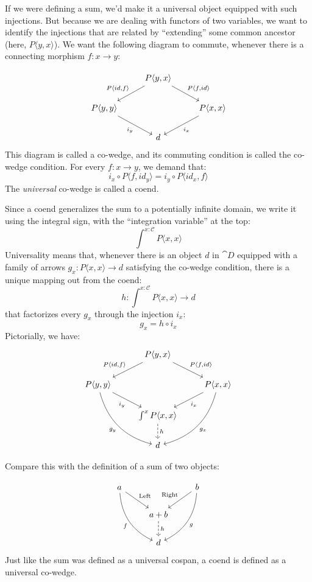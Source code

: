 \documentclass[DaoFP]{subfiles}
\begin{document}
If we were defining a sum, we'd make it a universal object equipped with such injections. But because we are dealing with functors of two variables, we want to identify the injections that are related by ``extending'' some common ancestor (here, $P \langle y, x \rangle$). We want the following diagram to commute, whenever there is a connecting morphism $f\colon x \to y$:

\[
 \begin{tikzcd}
 &P \langle y, x \rangle
 \arrow[ld, "{P \langle id, f \rangle}"']
 \arrow[rd, "{P \langle f, id \rangle}"]
 \\
 P \langle y, y \rangle
 \arrow[dr, "i_y"']
 &&P \langle x, x \rangle
 \arrow[dl, "i_x"]
 \\
 &d
 \end{tikzcd}
\]
This diagram is called a co-wedge, and its commuting condition is called the co-wedge condition. For every $f \colon x \to y$, we demand that:
\[ i_x \circ P \langle f, id_y \rangle = i_y \circ P \langle id_x, f \rangle \]
The \emph{universal} co-wedge is called a coend.

Since a coend generalizes the sum to a potentially infinite domain, we write it using the integral sign, with the ``integration variable'' at the top:
\[ \int^{x\colon \mathcal{C}} P \langle x, x \rangle \]
Universality means that, whenever there is an object $d$ in $\cat D$ equipped with a family of arrows $g_x \colon P \langle x, x \rangle \to d$ satisfying the co-wedge condition, there is a unique mapping out from the coend:
\[ h \colon \int^{x\colon \mathcal{C}} P \langle x, x \rangle \to d \]
that factorizes every $g_x$ through the injection $i_x$:
\[ g_x = h \circ i_x \]
Pictorially, we have:
\[
 \begin{tikzcd}
 &P \langle y, x \rangle
 \arrow[ld, "{P \langle id, f \rangle}"']
 \arrow[rd, "{P \langle f, id \rangle}"]
 \\
 P \langle y, y \rangle
 \arrow[dr, "i_y"']
 \arrow[ddr, bend right,  "g_y"']
 &&P \langle x, x \rangle
 \arrow[dl, "i_x"]
 \arrow[ddl, bend left,  "g_x"]
 \\
 &\int^x P \langle x, x \rangle
 \arrow[d, dashed, "h"]
 \\
 &d
 \end{tikzcd}
\]

Compare this with the definition of a sum of two objects:

\[
 \begin{tikzcd}
 a
 \arrow[dr, "\text{Left}"]
 \arrow[ddr, bend right, "f"']
 && b
 \arrow[dl, "\text{Right}"']
 \arrow[ddl, bend left, "g"]
 \\
&a + b
\arrow[d, dashed, "h"]
\\
& d
 \end{tikzcd}
\]
Just like the sum was defined as a universal cospan, a coend is defined as a universal co-wedge. 
\end{document}
